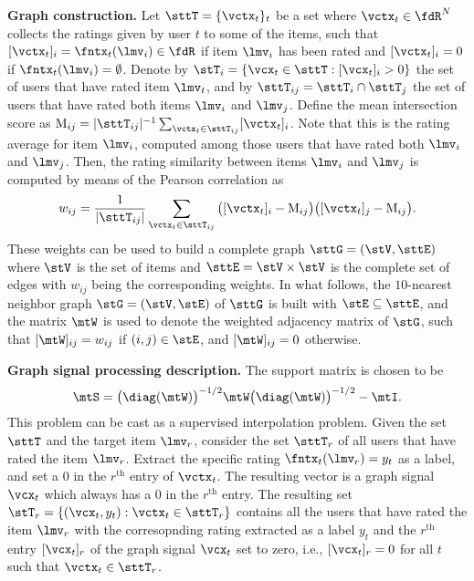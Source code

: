 \textbf{Graph construction.} Let $\sttT = \{\vctx_{t}\}_{t}$ be a set where $\vctx_{t} \in \fdR^{N}$ collects the ratings given by user $t$ to some of the items, such that $[\vctx_{t}]_{i} = \fntx_{t} (\lmv_{i}) \in \fdR$ if item $\lmv_{i}$ has been rated and $[\vctx_{t}]_{i} = 0$ if $\fntx_{t}(\lmv_{i}) = \emptyset$. Denote by $\stT_{i} = \{\vcx_{t} \in \sttT : [\vcx_{t}]_{i} > 0\}$ the set of users that have rated item $\lmv_{t}$, and by $\sttT_{ij} = \sttT_{i} \cap \sttT_{j}$ the set of users that have rated both items $\lmv_{i}$ and $\lmv_{j}$. Define the mean intersection score as $\mu_{ij} = |\sttT_{ij}|^{-1} \sum_{\vctx_{t} \in \sttT_{ij}} [\vctx_{t}]_{i}$. Note that this is the rating average for item $\lmv_{i}$, computed among those users that have rated both $\lmv_{i}$ and $\lmv_{j}$. Then, the rating similarity between items $\lmv_{i}$ and $\lmv_{j}$ is computed by means of the Pearson correlation as
\begin{equation}
      w_{ij}  = \frac{1}{|\sttT_{ij}|} \sum_{\vctx_{t} \in \sttT_{ij}} \big( [\vctx_{t}]_{i} - \mu_{ij} \big) \big( [\vctx_{t}]_{j} - \mu_{ij} \big).
\end{equation}
%
These weights can be used to build a complete graph $\sttG = (\stV, \sttE)$ where $\stV$ is the set of items and $\sttE = \stV \times \stV$ is the complete set of edges with $w_{ij}$ being the corresponding weights. In what follows, the $10$-nearest neighbor graph $\stG = (\stV, \stE)$ of $\sttG$ is built with $\stE \subseteq \sttE$, and the matrix $\mtW$ is used to denote the weighted adjacency matrix of $\stG$, such that $[\mtW]_{ij} = w_{ij}$ if $(i,j) \in \stE$, and $[\mtW]_{ij}=0$ otherwise.

\textbf{Graph signal processing description.} The support matrix is chosen to be
\begin{equation} \label{eq:app:movieSupport}
    \mtS = \big( \diag(\mtW) \big)^{-1/2} \mtW \big( \diag(\mtW) \big)^{-1/2} - \mtI.
\end{equation}
%
This problem can be cast as a supervised interpolation problem. Given the set $\sttT$ and the target item $\lmv_{r}$, consider the set $\sttT_{r}$ of all users that have rated the item $\lmv_{r}$. Extract the specific rating $\fntx_{t}(\lmv_{r}) = y_{t}$ as a label, and set a $0$ in the $r^{\text{th}}$ entry of $\vctx_{t}$. The resulting vector is a graph signal $\vcx_{t}$ which always has a $0$ in the $r^{\text{th}}$ entry. The resulting set $\stT_{r} = \{(\vcx_{t},y_{t}) : \vctx_{t} \in \sttT_{r}\}$ contains all the users that have rated the item $\lmv_{r}$ with the corresopnding rating extracted as a label $y_{t}$ and the $r^{\text{th}}$ entry $[\vcx_{t}]_{r}$ of the graph signal $\vcx_{t}$ set to zero, i.e., $[\vcx_{t}]_{r} = 0$ for all $t$ such that $\vctx_{t} \in \sttT_{r}$.

